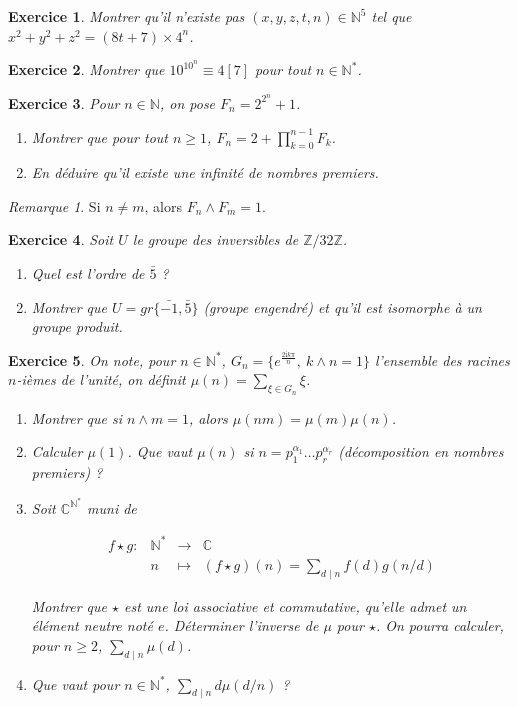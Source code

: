 \documentclass[12pt]{article}
\newtheorem{exercise}{Exercice}[section]
\theoremstyle{remark}
\theoremstyle{remark}
\newtheorem{remark}{Remarque}
\newcommand{\C}{\mathbb{C}}
\newcommand{\N}{\mathbb{N}}
\newcommand{\Z}{\mathbb{Z}}
\newcommand{\function}[5]{
	$$
	\begin{array}{rccl}
		#1: & #2 & \to & #3 \\
		& #4 & \mapsto & #5
	\end{array}
	$$
}
\begin{document}
\begin{exercise}
	Montrer qu'il n'existe pas $(x,y,z,t,n)\in \N^{5}$ tel que
	$x^{2}+y^{2}+z^{2}=(8t+7)\times 4^{n}$.
\end{exercise}

\begin{exercise}
	Montrer que $10^{10^{n}}\equiv 4 [7]$ pour tout $n\in\N^{*}$.
\end{exercise}

\begin{exercise}
	Pour $n\in\N$, on pose $F_{n}=2^{2^{n}}+1$.
	\begin{enumerate}
		\item Montrer que pour tout $n\geqslant1$, $F_{n}=2+\prod_{k=0}^{n-1}F_{k}$.
		\item En déduire qu'il existe une infinité de nombres premiers.
	\end{enumerate}
\end{exercise}

\begin{remark}
	Si $n\neq m$, alors $F_{n}\wedge F_{m}=1$.
\end{remark}

\begin{exercise}
	Soit $U$ le groupe des inversibles de $\Z/32\Z$.
	\begin{enumerate}
		\item Quel est l'ordre de $\bar{5}$ ?
		\item Montrer que $U=gr\{\bar{-1},\bar{5}\}$ (groupe engendré) et qu'il
		est isomorphe à un groupe produit.
	\end{enumerate}
\end{exercise}

\begin{exercise}
	On note, pour $n\in\N^{*}$, $G_{n}=\{e^{\frac{2\mathrm{i}k\pi}{n}},~k\wedge n=1\}$
	l'ensemble des racines $n$-ièmes de l'unité, on définit $\mu(n)=\sum_{\xi\in
	G_{n}}\xi$.
	\begin{enumerate}
		\item Montrer que si $n\wedge m=1$, alors $\mu(nm)=\mu(m)\mu(n)$.
		\item Calculer $\mu(1)$. Que vaut $\mu(n)$ si
		$n=p_{1}^{\alpha_{1}}\dots p_{r}^{\alpha_{r}}$ (décomposition en nombres
		premiers) ?
		\item Soit $\C^{\N^{*}}$ muni de 
		\function{f\star g}{\N^*}{\C}{n}{(f\star g)(n)=\sum_{d\mid n}f(d)g(n/d)}
		Montrer que $\star$ est une loi associative et commutative, qu'elle
		admet un élément neutre noté $e$. Déterminer l'inverse de $\mu$ pour
		$\star$. On pourra calculer, pour $n\geqslant2$, $\sum_{d\mid n}\mu(d)$.
		\item Que vaut pour $n\in\N^{*}$, $\sum_{d\mid n}d\mu(d/n)$ ?
	\end{enumerate}
\end{exercise}
\end{document}
